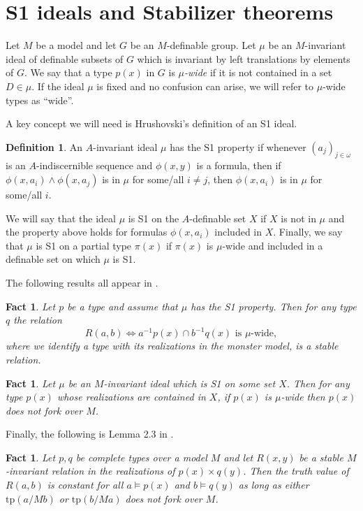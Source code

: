 \documentclass[12pt]{article}
\newtheorem{fait}[thm]{Fact}
\theoremstyle{definition}
\newtheorem{defi}[thm]{Definition}
\theoremstyle{mystyle}
\theoremstyle{remark}
\newcommand{\tp}{\mathrm{tp}}
\begin{document}
\section{S1 ideals and Stabilizer theorems}\label{SStabilizer}

Let $M$ be a model and let $G$ be an $M$-definable group. Let
$\mu$ be an $M$-invariant ideal of definable subsets of $G$ which
is invariant by left translations by elements of $G$. We say that
a type $p(x)$ in $G$ is \emph{$\mu$-wide} if it is not contained
in a set $D\in \mu$. If the ideal $\mu$ is fixed and no confusion
can arise, we will refer to $\mu$-wide types as ``wide''.


A key concept we will need is Hrushovski's definition of an S1
ideal.


\begin{defi}
An $A$-invariant ideal $\mu$ has the S1 property if whenever $(
a_j)_{j \in \omega}$ is an $A$-indiscernible sequence and
$\phi(x,y)$ is a formula, then if $\phi(x,a_i)\wedge \phi(x,a_j)$
is in $\mu$ for some/all $i\neq j$, then $\phi(x,a_i)$ is in $\mu$
for some/all $i$.

We will say that the ideal $\mu$ is S1 on the $A$-definable set
$X$ if $X$ is not in $\mu$ and the property above holds for
formulas $\phi(x,a_i)$ included in $X$. Finally, we say that $\mu$
is S1 on a partial type $\pi(x)$ if $\pi(x)$ is $\mu$-wide and
included in a definable set on which $\mu$ is S1.
\end{defi}


The following results all appear in \cite{Hru12}.

\begin{fait}\label{HrStable}
Let $p$ be a type and assume that $\mu$ has the S1 property. Then for any type $q$ the relation
\[
R(a,b) \iff a^{-1}p(x) \cap b^{-1}q(x) \text{ is $\mu$-wide},
\]
where we identify a type with its realizations in the monster model, is a stable relation.
\end{fait}


\begin{fait}\label{wide}
Let $\mu$ be an $M$-invariant ideal which is S1 on some set $X$.
Then for any type $p(x)$ whose realizations are contained in $X$,
if $p(x)$ is $\mu$-wide then $p(x)$ does not fork over $M$.
\end{fait}


Finally, the following  is Lemma 2.3 in \cite{Hru12}.

\begin{fait}
Let $p,q$ be complete types over a model $M$ and let $R(x,y)$ be a stable $M$-invariant relation in the realizations of $p(x)\times q(y)$. Then the truth value of $R(a,b)$ is constant
for all $a\models p(x)$ and $b\models q(y)$ as long as either $\tp(a/Mb)$ or $\tp(b/Ma)$ does not fork over $M$.
\end{fait}
\end{document}
